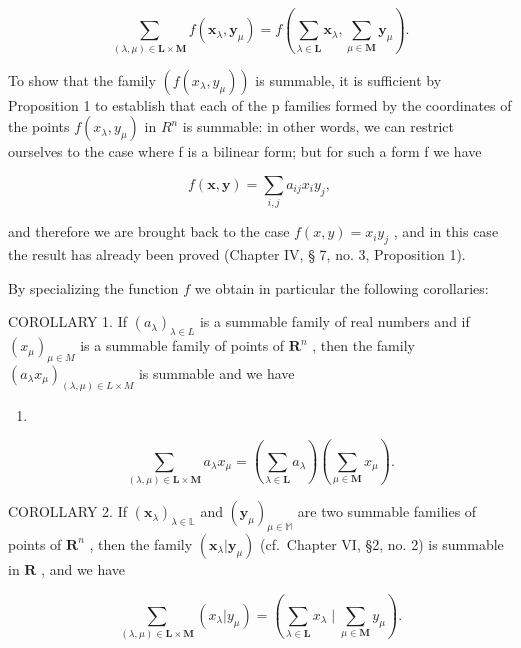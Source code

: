 \[
\sum_ {(\lambda , \mu) \in \mathbf {L} \times \mathbf {M}} f \left(\boldsymbol {x} _ {\lambda}, \boldsymbol {y} _ {\mu}\right) = f \left(\sum_ {\lambda \in \mathbf {L}} \boldsymbol {x} _ {\lambda}, \sum_ {\mu \in \mathbf {M}} \boldsymbol {y} _ {\mu}\right).\tag{3}
\]

To show that the family \((f(x_{\lambda}, y_{\mu}))\) is summable, it is sufficient by Proposition 1 to establish that each of the p families formed by the coordinates of the points \(f(x_{\lambda}, y_{\mu})\) in \(R^{n}\) is summable: in other words, we can restrict ourselves to the case where f is a bilinear form; but for such a form f we have

\[
f (\boldsymbol {x}, \boldsymbol {y}) = \sum_ {i, j} a _ {i j} x _ {i} y _ {j},
\]

and therefore we are brought back to the case \(f(x, y) = x_i y_j\) , and in this case the result has already been proved (Chapter IV, § 7, no. 3, Proposition 1).

By specializing the function \(f\) we obtain in particular the following corollaries:

COROLLARY 1. If \((a_{\lambda})_{\lambda \in L}\) is a summable family of real numbers and if \((x_{\mu})_{\mu \in M}\) is a summable family of points of \(\mathbf{R}^n\) , then the family \((a_{\lambda}x_{\mu})_{(\lambda, \mu) \in L \times M}\) is summable and we have

\begin{enumerate}
\def\labelenumi{(\arabic{enumi})}
\setcounter{enumi}{3}
\tightlist
\item
\end{enumerate}

\[
\sum_ {(\lambda , \mu) \in \mathbf {L} \times \mathbf {M}} a _ {\lambda} x _ {\mu} = \left(\sum_ {\lambda \in \mathbf {L}} a _ {\lambda}\right) \left(\sum_ {\mu \in \mathbf {M}} x _ {\mu}\right).
\]

COROLLARY 2. If \((\pmb{x}_{\lambda})_{\lambda \in \mathbb{L}}\) and \((\pmb{y}_{\mu})_{\mu \in \mathbb{M}}\) are two summable families of points of \(\mathbf{R}^n\) , then the family \((\pmb{x}_{\lambda}|\pmb{y}_{\mu})\) (cf.~Chapter VI, §2, no. 2) is summable in \(\mathbf{R}\) , and we have

\[
\sum_ {(\lambda , \mu) \in \mathbf {L} \times \mathbf {M}} (x _ {\lambda} | y _ {\mu}) = \left(\sum_ {\lambda \in \mathbf {L}} x _ {\lambda} \mid \sum_ {\mu \in \mathbf {M}} y _ {\mu}\right).\tag{5}
\]

